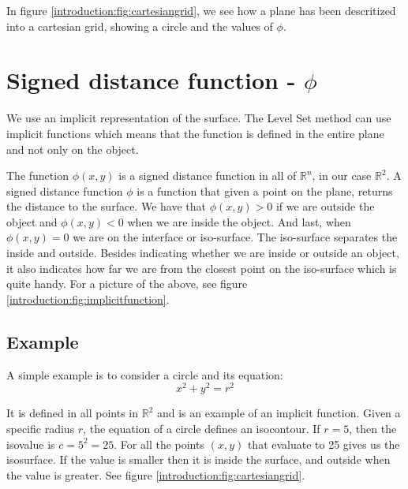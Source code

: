 In figure \vref{introduction:fig:cartesiangrid}, we see how a plane
has been descritized into a cartesian grid, showing a circle and the
values of $\phi$.

\section*{Signed distance function - $\phi$}

We use an implicit representation of the surface. The Level Set method
can use implicit functions which means that the function is defined in
the entire plane and not only on the object.

The function $\phi(x,y)$ is a signed distance function in all of
$\mathbb{R}^{n}$, in our case $\mathbb{R}^{2}$. A signed distance
function $\phi$ is a function that given a point on the plane, returns
the distance to the surface. We have that $\phi(x,y) > 0$ if we are
outside the object and $\phi(x,y) < 0$ when we are inside the object.
And last, when $\phi(x,y) = 0$ we are on the interface or iso-surface.
The iso-surface separates the inside and outside.  Besides indicating
whether we are inside or outside an object, it also indicates how far
we are from the closest point on the iso-surface which is quite
handy. For a picture of the above, see figure
\vref{introduction:fig:implicitfunction}.



\subsection*{Example}

A simple example is to consider a circle and its equation:
\begin{equation*} x^{2} + y^{2} = r^{2}
\end{equation*}

It is defined in all points in $\mathbb{R}^{2}$ and is an example of
an implicit function. Given a specific radius $r$, the equation of a
circle defines an isocontour. If $r = 5$, then the isovalue is $c =
5^{2} = 25$. For all the points $(x,y)$ that evaluate to 25 gives us
the isosurface. If the value is smaller then it is inside the surface,
and outside when the value is greater. See figure
\vref{introduction:fig:cartesiangrid}.

